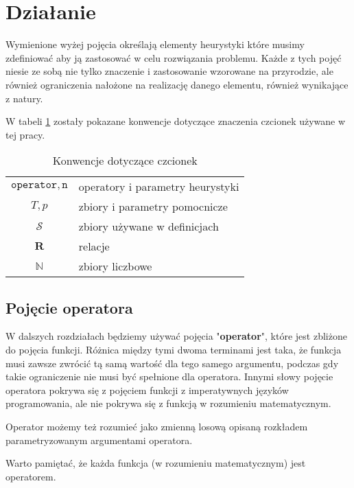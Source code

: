 \documentclass[twoside]{iisthesis}
\newcommand{\numberSet}{\mathbb}
\newcommand{\important}{\mathcal}
\newcommand{\R}{\mathbf{R}}
\newcommand{\param}{\mathtt}
\begin{document}
\section{Działanie}

Wymienione wyżej pojęcia określają elementy heurystyki które musimy zdefiniować aby ją zastosować w celu rozwiązania problemu. Każde z tych pojęć niesie ze sobą nie tylko znaczenie i zastosowanie wzorowane na przyrodzie, ale również ograniczenia nałożone na realizację danego elementu, również wynikające z natury.

W tabeli \ref{table_signature_conventions} zostały pokazane konwencje dotyczące znaczenia czcionek używane w tej pracy.


\begin{table}
	\caption{Konwencje dotyczące czcionek \label{table_signature_conventions}}
	\centering
	\begin{tabular}{cl}
		$\param{operator}, \param{n}$ & operatory i parametry heurystyki \\
		$T, p$ & zbiory i parametry pomocnicze \\
		$\important{S}$ & zbiory używane w definicjach \\
		$\R$ & relacje \\
		$\numberSet{N}$ & zbiory liczbowe
	\end{tabular}
\end{table}

\subsection{Pojęcie operatora} \label{subsection_operator}

W dalszych rozdziałach będziemy używać pojęcia "\textbf{operator}", które jest zbliżone do pojęcia funkcji. Różnica między tymi dwoma terminami jest taka, że funkcja musi zawsze zwrócić tą samą wartość dla tego samego argumentu, podczas gdy takie ograniczenie nie musi być spełnione dla operatora. Innymi słowy pojęcie operatora pokrywa się z pojęciem funkcji z imperatywnych języków programowania, ale nie pokrywa się z funkcją w rozumieniu matematycznym.

Operator możemy też rozumieć jako zmienną losową opisaną rozkładem parametryzowanym argumentami operatora.

Warto pamiętać, że każda funkcja (w rozumieniu matematycznym) jest operatorem.
\end{document}
